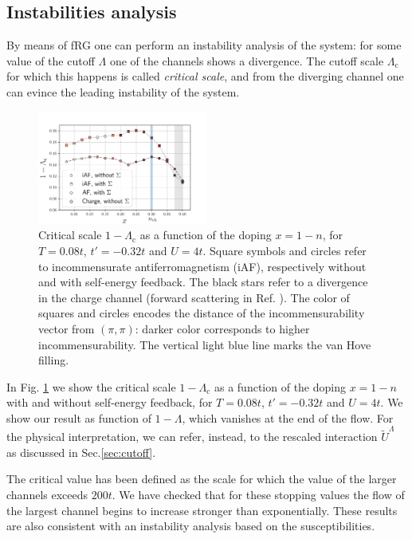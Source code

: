 \subsection{Instabilities analysis}
By means of fRG one can perform an instability analysis of the system: 
for some value of the cutoff $\Lambda$ one of the channels shows a divergence. 
The cutoff scale $\Lambda_{\mathrm{c}} $ for which this happens is called \textit{critical scale}, and from the diverging channel one can evince the leading instability of the system. 
\begin{figure}
\includegraphics[width=0.5\textwidth]{images/phasediag.png}
\caption{Critical scale $1-\Lambda_{\mathrm{c}}$ as a function of the doping $x=1-n$, for $T = 0.08t$, $t'=-0.32t$ and $U=4t$. 
Square symbols and circles refer to incommensurate antiferromagnetism (iAF), respectively without and with self-energy feedback.
The black stars refer to a divergence in the charge channel (forward scattering in Ref. ). 
The color of squares and circles encodes the distance of the incommensurability vector from $(\pi,\pi)$: darker color corresponds to higher incommensurability. 
The vertical light blue line marks the van Hove filling.}  
\label{fig:criscale} 
\end{figure}
In Fig. \ref{fig:criscale} we show the critical scale $1-\Lambda_{\mathrm{c}}$ as a function of the doping $x=1-n$ with and without self-energy feedback,  for $T=0.08t$, $t'=-0.32t$ and  $U=4t$.
We show our result as function of $1-\Lambda$, which vanishes at the end of the flow. 
For the physical interpretation, we can refer, instead, to the rescaled interaction\cite{Honerkamp2004} $\tilde U ^\Lambda$ as discussed in Sec.\ref{sec:cutoff}.  


The critical value has been defined as the scale for which the value of  the larger channels exceeds $200t$. 
We have checked that for these stopping values the flow of the largest channel begins to increase stronger than exponentially. These results are also consistent with an instability analysis based on the susceptibilities.        

